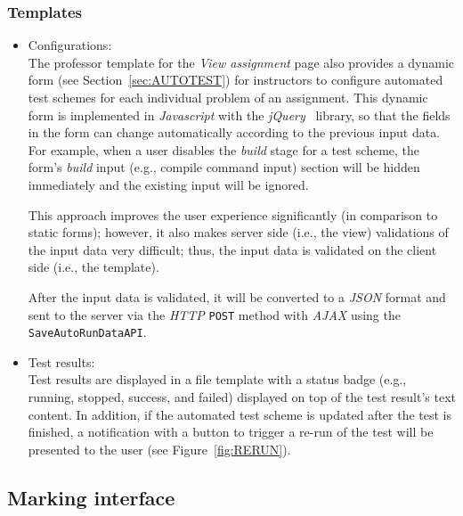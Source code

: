 \subsubsection{Templates}
\begin{itemize}
    \item Configurations: \\
    The professor template for the \emph{View assignment} page also provides
    a dynamic form (see Section~\ref{sec:AUTOTEST}) for instructors to
    configure automated test schemes for
    each individual problem of an assignment. 
    This dynamic form is implemented in \emph{Javascript} with the
    \emph{jQuery}~\cite{jQuery} library, so that the fields in the form can
    change automatically according to the previous input data.
    For example, when a user disables the \emph{build} stage for a test scheme,
    the form's \emph{build} input (e.g., compile command input) section will
    be hidden immediately and the existing input will be ignored.

    This approach improves the user experience significantly (in comparison to
    static forms); however, it also makes server side (i.e., the view)
    validations of the
    input data very difficult; thus, the input data is validated on the
    client side (i.e., the template).

    After the input data is validated, it will be converted to a \emph{JSON}
    format and sent to the server via the \emph{HTTP} \texttt{POST} method
    with \emph{AJAX} using the \texttt{SaveAutoRunDataAPI}.

    \item Test results: \\
    Test results are displayed in a file template with a status badge
    (e.g., running, stopped, success, and failed)
    displayed on top of the test result's text content.
    In addition, if the automated test scheme is updated after the test
    is finished, a notification with a button to trigger a re-run
    of the test will be presented to the user (see Figure~\ref{fig:RERUN}).
\end{itemize}

\FloatBarrier





\subsection{Marking interface}

